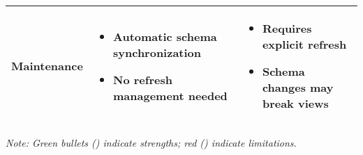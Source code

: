 \begin{table}[H]
{\begin{tabular}{
      >{\raggedright\arraybackslash}m{} 
      >{\raggedright\arraybackslash}m{} 
      >{\raggedright\arraybackslash}m{}
    }
      \cellcolor{blue!5}\textbf{Maintenance} & 
      \begin{itemize}[leftmargin=*,noitemsep,topsep=2pt]
        \item[\color{green!60!black}\textbullet] Automatic schema synchronization
        \item[\color{green!60!black}\textbullet] No refresh management needed
      \end{itemize} & 
      \begin{itemize}[leftmargin=*,noitemsep,topsep=2pt]
        \item[\color{red}\textbullet] Requires explicit refresh
        \item[\color{red}\textbullet] Schema changes may break views
      \end{itemize} \\
      \bottomrule
    \end{tabular}%
  }
  \vspace{4pt}
  \footnotesize\textit{Note: Green bullets (\textcolor{green!60!black}{\textbullet}) indicate strengths; red (\textcolor{red}{\textbullet}) indicate limitations.}
\end{table}

